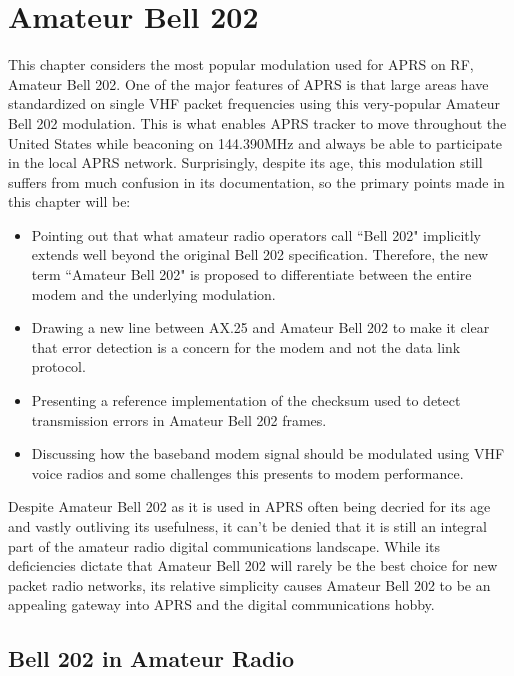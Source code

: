 \chapter{Amateur Bell 202}
\label{chap:bell202}

This chapter considers the most popular modulation used for APRS
on RF, Amateur Bell 202.
One of the major features of APRS is that large areas have standardized
on single VHF packet frequencies using this very-popular Amateur Bell 202 modulation.
This is what enables APRS tracker to move throughout the United States
while beaconing on 144.390MHz and always be able to participate in the local
APRS network.
Surprisingly, despite its age, this modulation still suffers from much 
confusion in its documentation, so the primary points made in this chapter will be:
\begin{itemize}
	\item Pointing out that what amateur radio operators call ``Bell 202"
		implicitly extends well beyond the original Bell 202 specification.
		Therefore, the new term ``Amateur Bell 202"
		is proposed to differentiate between the entire modem and the 
		underlying modulation.
	\item Drawing a new line between AX.25 and Amateur Bell 202 to make it clear
		that error detection is a concern for the modem and not the 
		data link protocol.
	\item Presenting a reference implementation of the checksum used
		to detect transmission errors in Amateur Bell 202 frames.
	\item Discussing how the baseband modem signal should be modulated using
		VHF voice radios and some challenges this presents
		to modem performance.
\end{itemize}

Despite Amateur Bell 202 as it is used in APRS often being decried for its age and 
vastly outliving its usefulness,
it can't be denied that it is still an integral part of the amateur radio
digital communications landscape.
While its deficiencies dictate that Amateur Bell 202 will rarely be the best
choice for new packet radio networks, 
its relative simplicity causes
Amateur Bell 202 to be an appealing gateway into APRS and 
the digital communications hobby.

\section{Bell 202 in Amateur Radio}
\label{sec:bell202history}

